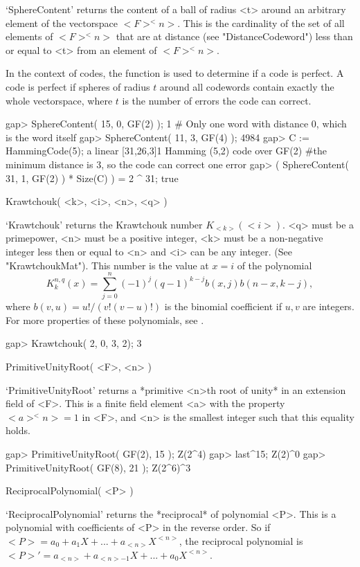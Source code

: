 `SphereContent' returns the  content of a   ball of radius <t>  around an
arbitrary  element of the vectorspace $<F>^<n>$.  This is the cardinality
of  the set of    all elements of  $<F>^<n>$   that are at  distance (see
"DistanceCodeword")  less  than  or   equal to <t>   from  an  element of
$<F>^<n>$.

In the context of codes, the function  is used to  determine if a code is
perfect. A code is perfect if spheres  of radius $t$ around all codewords
contain exactly the whole vectorspace, where  $t$ is the number of errors
the code can correct.

\beginexample
gap> SphereContent( 15, 0, GF(2) );
1    # Only one word with distance 0, which is the word itself
gap> SphereContent( 11, 3, GF(4) );
4984
gap> C := HammingCode(5);
a linear [31,26,3]1 Hamming (5,2) code over GF(2)
#the minimum distance is 3, so the code can correct one error
gap> ( SphereContent( 31, 1, GF(2) ) * Size(C) ) = 2 ^ 31;
true 
\endexample

\>Krawtchouk( <k>, <i>, <n>, <q> )

`Krawtchouk' returns the Krawtchouk number $K_{<k>}(<i>)$.  <q> must be a
primepower, <n> must  be a positive integer,  <k> must  be a non-negative
integer less  then  or equal to   <n> and <i> can   be any  integer. (See
"KrawtchoukMat"). This number is the value at $x=i$ of the 
polynomial 
$$
K_k^{n,q}(x)
=\sum_{j=0}^n (-1)^j(q-1)^{k-j}b(x,j)b(n-x,k-j),
$$
where $b(v,u)=u!/(v!(v-u)!)$ is the binomial coefficient if $u,v$ are
integers. For more properties of these polynomials,
see \cite{MS83}.

\beginexample
gap> Krawtchouk( 2, 0, 3, 2);
3 
\endexample

\>PrimitiveUnityRoot( <F>, <n> )

`PrimitiveUnityRoot'  returns a *primitive  <n>th  root of  unity* in  an
extension  field  of <F>. This  is a  finite  field element  <a> with the
property $<a>^<n>=1 $ in <F>, and <n> is the smallest integer such that
this equality holds.

\beginexample
gap> PrimitiveUnityRoot( GF(2), 15 );
Z(2^4)
gap> last^15;
Z(2)^0
gap> PrimitiveUnityRoot( GF(8), 21 );
Z(2^6)^3 
\endexample

\>ReciprocalPolynomial( <P> )

`ReciprocalPolynomial' returns the  *reciprocal* of  polynomial <P>. This
is a polynomial   with coefficients of <P>   in the reverse  order. So if
$<P>=a_0 + a_1 X +  ... + a_{<n>}  X^{<n>}$, the reciprocal polynomial is
$<P>'=a_{<n>} + a_{<n>-1} X + ... + a_0 X^{<n>}$.

